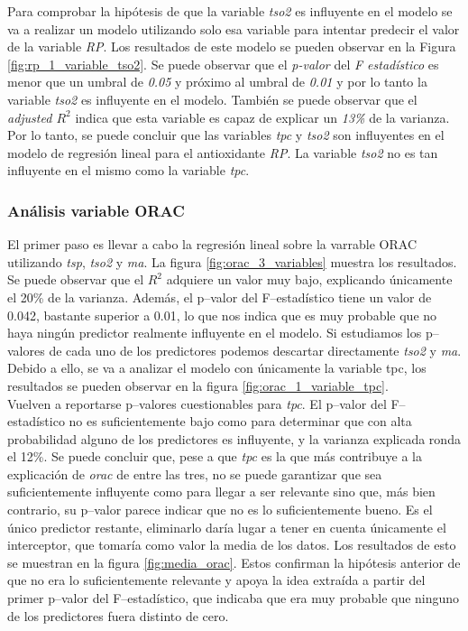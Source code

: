 \documentclass{article}
\begin{document}
Para comprobar la hipótesis de que la variable \textit{tso2} es influyente en el modelo se va a realizar un modelo utilizando solo esa variable para intentar predecir el valor de la variable \textit{RP}. Los resultados de este modelo se pueden observar en la Figura \ref{fig:rp_1_variable_tso2}. Se puede observar que el \textit{p-valor} del \textit{F estadístico} es menor que un umbral de \textit{0.05} y próximo al umbral de \textit{0.01} y por lo tanto la variable \textit{tso2} es influyente en el modelo. También se puede observar que el \textit{adjusted $R^2$} indica que esta variable es capaz de explicar un \textit{13\%} de la varianza.\\

Por lo tanto, se puede concluir que las variables \textit{tpc} y \textit{tso2} son influyentes en el modelo de regresión lineal para el antioxidante \textit{RP}. La variable \textit{tso2} no es tan influyente en el mismo como la variable \textit{tpc}.\\


\subsubsection{Análisis variable ORAC}

El primer paso es llevar a cabo la regresión lineal sobre la varrable ORAC utilizando \textit{tsp}, \textit{tso2} y \textit{ma}. La figura \ref{fig:orac_3_variables} muestra los resultados. Se puede observar que el $R^{2}$ adquiere un valor muy bajo, explicando únicamente el 20\% de la varianza. Además, el p--valor del F--estadístico tiene un valor de 0.042, bastante superior a 0.01, lo que nos indica que es muy probable que no haya ningún predictor realmente influyente en el modelo. Si estudiamos los p--valores de cada uno de los predictores podemos descartar directamente \textit{tso2} y \textit{ma}. Debido a ello, se va a analizar el modelo con únicamente la variable tpc, los resultados se pueden observar en la figura \ref{fig:orac_1_variable_tpc}.\\

Vuelven a reportarse p--valores cuestionables para \textit{tpc}. El p--valor del F--estadístico no es suficientemente bajo como para determinar que con alta probabilidad alguno de los predictores es influyente, y la varianza explicada ronda el 12\%. Se puede concluir que, pese a que \textit{tpc} es la que más contribuye a la explicación de \textit{orac} de entre las tres, no se puede garantizar que sea suficientemente influyente como para llegar a ser relevante sino que, más bien contrario, su p--valor parece indicar que no es lo suficientemente bueno. Es el único predictor restante, eliminarlo daría lugar a tener en cuenta únicamente el interceptor, que tomaría como valor la media de los datos. Los resultados de esto se muestran en la figura \ref{fig:media_orac}. Estos confirman la hipótesis anterior de que no era lo suficientemente relevante y apoya la idea extraída a partir del primer p--valor del F--estadístico, que indicaba que era muy probable que ninguno de los predictores fuera distinto de cero. \\
\end{document}
